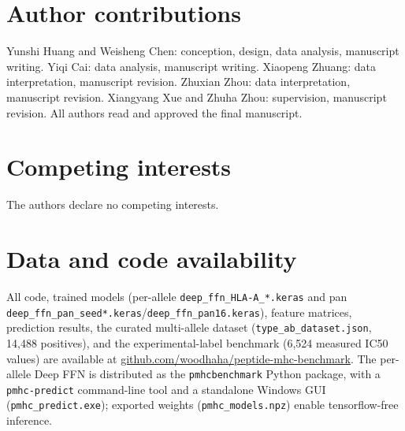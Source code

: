 \section*{Author contributions}

Yunshi Huang and Weisheng Chen: conception, design, data analysis, manuscript writing. Yiqi Cai: data analysis, manuscript writing. Xiaopeng Zhuang: data interpretation, manuscript revision. Zhuxian Zhou: data interpretation, manuscript revision. Xiangyang Xue and Zhuha Zhou: supervision, manuscript revision. All authors read and approved the final manuscript.

\section*{Competing interests}

The authors declare no competing interests.

\section*{Data and code availability}

All code, trained models (per-allele \texttt{deep\_ffn\_HLA-A\_*.keras} and pan \texttt{deep\_ffn\_pan\_seed*.keras}/\texttt{deep\_ffn\_pan16.keras}), feature matrices, prediction results, the curated multi-allele dataset (\texttt{type\_ab\_dataset.json}, 14,488 positives), and the experimental-label benchmark (6,524 measured IC50 values) are available at \href{https://github.com/woodhaha/peptide-mhc-benchmark}{github.com/woodhaha/peptide-mhc-benchmark}. The per-allele Deep FFN is distributed as the \texttt{pmhcbenchmark} Python package, with a \texttt{pmhc-predict} command-line tool and a standalone Windows GUI (\texttt{pmhc\_predict.exe}); exported weights (\texttt{pmhc\_models.npz}) enable tensorflow-free inference.

